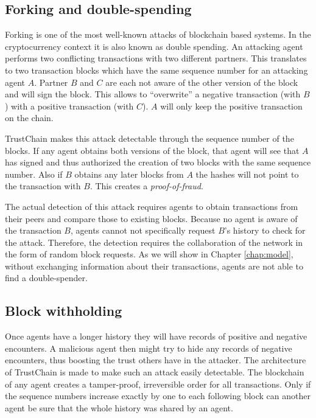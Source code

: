 \subsection{Forking and double-spending}
Forking is one of the most well-known attacks of blockchain based systems. In the cryptocurrency 
context it is also known as double spending. An attacking agent 
performs two conflicting transactions with two different partners. This translates to two transaction
blocks which have the same sequence number for an attacking agent $A$. Partner $B$ and $C$ are each
not aware of the other version of the block and will sign the block. This allows to ``overwrite''
a negative transaction (with $B$) with a positive transaction (with $C$). $A$ will only keep the positive transaction on 
the chain. 

TrustChain makes this attack detectable through the sequence number of the blocks. If any agent 
obtains both versions of the block, that agent will see that $A$ has signed and thus authorized the
creation of two blocks with the same sequence number. Also if $B$ obtains any later blocks from $A$ 
the hashes will not point to the transaction with $B$.  This creates a \textit{proof-of-fraud}. 

The actual
detection of this attack requires agents to obtain transactions from their peers and compare those 
to existing blocks. Because no agent is aware of the transaction $B$, agents cannot not specifically 
request $B$'s history to check for the attack. Therefore, the detection requires the collaboration
of the network in the form of random block requests. As we will show in Chapter \ref{chap:model}, 
without exchanging information about their transactions, agents are not able to find a double-spender.

\subsection{Block withholding}
Once agents have a longer history they will have records of positive and negative encounters. A 
malicious agent then might try to hide any records of negative encounters, thus boosting the trust 
others have in the attacker. The architecture of TrustChain is made to make such an attack easily detectable.
The blockchain of any agent creates a tamper-proof, irreversible order for all transactions. Only if
the sequence numbers increase exactly by one to each following block can another agent be sure that 
the whole history was shared by an agent. 

